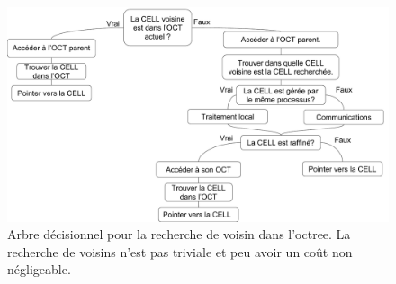 \begin{figure}[bth]
        \includegraphics[width=.95\linewidth]{img/02/voisins.pdf} 
        \caption[Recherche de voisin dans l'octree.]{Arbre décisionnel pour la recherche de voisin dans l'octree.
        La recherche de voisins n'est pas triviale et peu avoir un coût non négligeable.
     	\label{fig:voisin} }
\end{figure}

%
%
